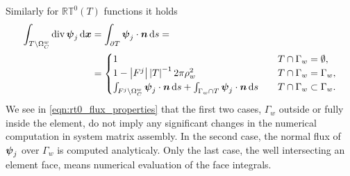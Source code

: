 Similarly for $\mathbb{RT}^0(T)$ functions it holds
\begin{align} \label{eqn:rt0_flux_properties}
    \int_{T\setminus\Omega^w_C} {\rm div}\,\mathbf{\boldsymbol{\psi}}_{j}\,{\rm d}\mathbf{\boldsymbol{x}}
    &= \int_{\partial T} \mathbf{\boldsymbol{\psi}}_{j}\cdot\mathbf{\boldsymbol{n}} \,{\rm d} s = \nonumber\\
    &= \begin{cases}
        1 & \quad T \cap \Gamma_w=\emptyset, \\
        1-\left|F^j\right|\left|T\right|^{-1}2\pi\rho_w^2 & \quad T \cap \Gamma_w=\Gamma_w, \\
        \int_{F^j\setminus \Omega^w_C} \mathbf{\boldsymbol{\psi}}_j\cdot\mathbf{\boldsymbol{n}} \,{\rm d} s
            +\int_{\Gamma_w\cap T} \mathbf{\boldsymbol{\psi}}_j\cdot\mathbf{\boldsymbol{n}} \,{\rm d} s
            &\quad T \cap \Gamma_w\subset\Gamma_w. \\
        \end{cases}
\end{align}
%
We see in \eqref{eqn:rt0_flux_properties} that the first two cases, $\Gamma_w$ outside
or fully inside the element, do not imply any significant changes in the numerical computation
in system matrix assembly. In the second case, the normal flux of $\mathbf{\boldsymbol{\psi}}_j$ over $\Gamma_w$
is computed analyticaly.
Only the last case, the well intersecting an element face, means
numerical evaluation of the face integrals.

